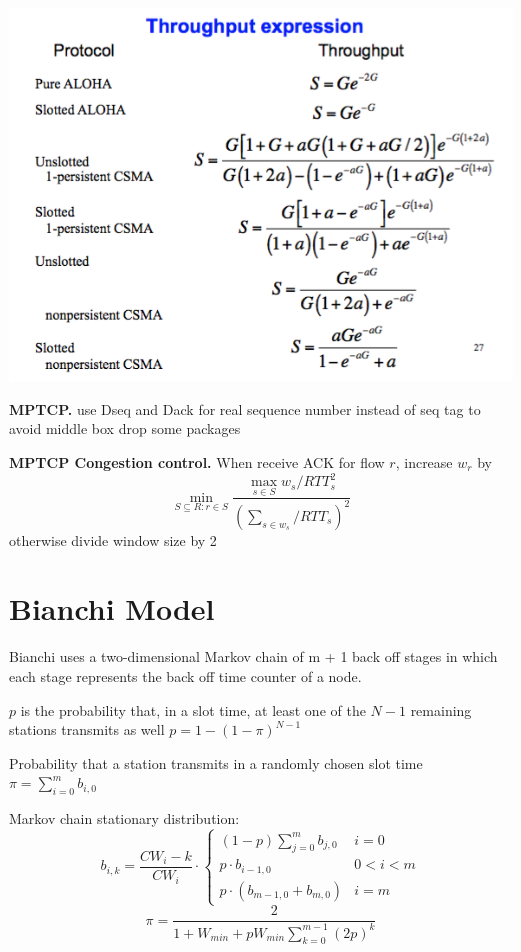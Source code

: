 \documentclass[10pt,twocolumn]{article}
\renewcommand{\l}{\left}
\renewcommand{\r}{\right}
\renewcommand{\bf}{\textbf}
\begin{document}
\includegraphics[width=\linewidth]{figures/throughput.png}

\bf{MPTCP.} use Dseq and Dack for real sequence number instead of seq tag to avoid middle box drop some packages

\bf{MPTCP Congestion control.} When receive ACK for flow $r$, increase $w_r$ by
\[
  \min_{S\subseteq R: r\in S} \frac{\max_{s\in S}w_s / RTT_s^2}{\l( \sum_{s\in w_s}/ RTT_s \r)^2}
\]
otherwise divide window size by 2

\section{Bianchi Model}


Bianchi uses a two-dimensional Markov chain of m + 1 back off stages in which each stage represents the back off time counter of a node.

$p$ is the probability that, in a slot time, at least one of the $N-1$ remaining stations transmits as well $p=1-(1-\pi)^{N-1}$

Probability that a station transmits in a randomly chosen slot time $\pi = \sum_{i=0}^m b_{i,0}$

Markov chain stationary distribution:
\[
  b_{i,k} = \frac{CW_i - k}{CW_i} \cdot \begin{cases}
    (1-p) \sum_{j=0}^m b_{j,0} & i = 0\\
    p \cdot b_{i-1,0} & 0 < i < m \\
    p\cdot(b_{m-1,0}+b_{m,0}) & i = m
  \end{cases}
\]
\[
  \pi = \frac 2 {1+W_{min} + p W_{min} \sum_{k=0}^{m-1}(2p)^k}
\]
\end{document}
